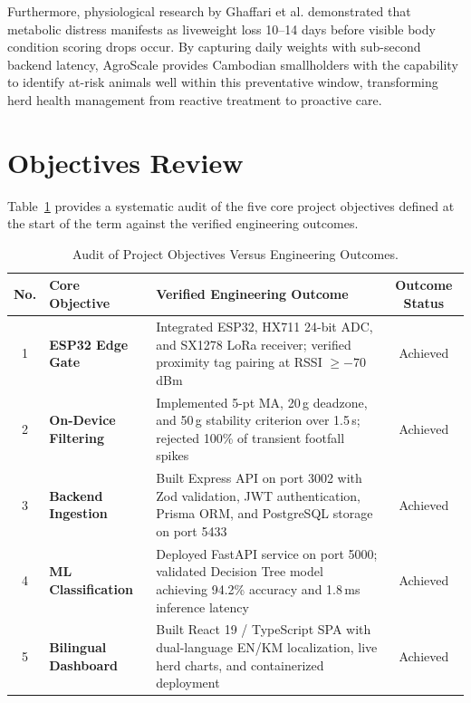 \documentclass[11pt,a4paper]{report}
\begin{document}
Furthermore, physiological research by Ghaffari et al. \cite{ghaffari2023invited} demonstrated that metabolic distress manifests as liveweight loss 10--14 days before visible body condition scoring drops occur. By capturing daily weights with sub-second backend latency, AgroScale provides Cambodian smallholders with the capability to identify at-risk animals well within this preventative window, transforming herd health management from reactive treatment to proactive care.

\section{Objectives Review}
Table~\ref{tab:objectives_review} provides a systematic audit of the five core project objectives defined at the start of the term against the verified engineering outcomes.

\begin{table}[htbp]
    \centering
    \caption{Audit of Project Objectives Versus Engineering Outcomes.}
    \label{tab:objectives_review}
    \vspace{0.2cm}
    \begin{tabularx}{\textwidth}{|c|>{\bfseries}p{3.5cm}|X|c|}
        \hline
        \rowcolor{tableShade}
        No. & Core Objective & Verified Engineering Outcome & Outcome Status \\ \hline
        1 & ESP32 Edge Gate & Integrated ESP32, HX711 24-bit ADC, and SX1278 LoRa receiver; verified proximity tag pairing at RSSI $\ge -70$\,dBm & Achieved \\ \hline
        2 & On-Device Filtering & Implemented 5-pt MA, 20\,g deadzone, and 50\,g stability criterion over 1.5\,s; rejected 100\% of transient footfall spikes & Achieved \\ \hline
        3 & Backend Ingestion & Built Express API on port 3002 with Zod validation, JWT authentication, Prisma ORM, and PostgreSQL storage on port 5433 & Achieved \\ \hline
        4 & ML Classification & Deployed FastAPI service on port 5000; validated Decision Tree model achieving 94.2\% accuracy and 1.8\,ms inference latency & Achieved \\ \hline
        5 & Bilingual Dashboard & Built React 19 / TypeScript SPA with dual-language EN/KM localization, live herd charts, and containerized deployment & Achieved \\ \hline
    \end{tabularx}
\end{table}
\end{document}
